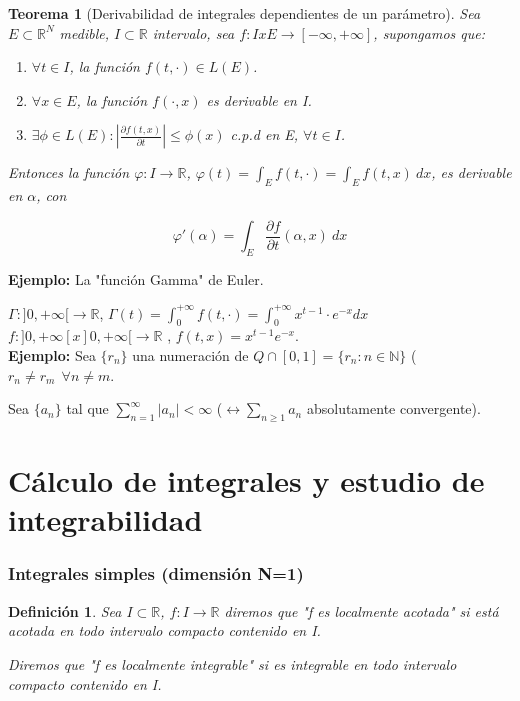 \documentclass{article}
\newtheorem{theorem}{Teorema}
\newtheorem{definition}{Definición}
\begin{document}
\begin{theorem}[Derivabilidad de integrales dependientes de un parámetro]
Sea $E \subset \mathbb{R}^N$ medible, $I \subset \mathbb{R}$ intervalo, sea $f:IxE \rightarrow [-\infty, +\infty]$, supongamos que:

\begin{enumerate}[label=(\roman*)]
\item $\forall t \in I$, la función $f(t,\cdot) \in L(E)$.
\item $\forall x \in E$, la función $f(\cdot,x)$ es derivable en I.
\item $\exists \phi \in L(E): |\frac{\partial f(t,x)}{\partial t}|\leq \phi(x)$ c.p.d en E, $\forall t \in I$.

\end{enumerate}

Entonces la función $\varphi: I \rightarrow \mathbb{R}$, $\varphi(t) = \int_E f(t,\cdot) = \int_E f(t,x) \> dx$, es derivable en $\alpha$, con 

\begin{equation}
\varphi'(\alpha) = \int_E \frac{\partial f}{\partial t}(\alpha,x) \> dx
\end{equation}

\end{theorem}

\textbf{Ejemplo:} La "función Gamma" de Euler.

$\Gamma: ]0,+\infty[ \rightarrow \mathbb{R}$, $\Gamma(t) = \int_0^{+\infty} f(t,\cdot) = \int_0^{+\infty} x^{t-1}\cdot e^{-x}dx$ \\

$f:]0,+\infty[x]0,+\infty[ \longrightarrow \mathbb{R}$ , $f(t,x) = x^{t-1}e^{-x}$. \\


\textbf{Ejemplo:} Sea $\{r_n\}$ una numeración de $Q \cap [0,1] = \{r_n: n \in \mathbb{N}\}$ ($r_n \neq r_m \>\> \forall n \neq m$.

Sea $\{a_n\}$ tal que $\sum_{n=1}^\infty |a_n| < \infty$ ($\leftrightarrow \sum_{n\geq 1} a_n$ absolutamente convergente).

\section{Cálculo de integrales y estudio de integrabilidad}
\subsubsection{Integrales simples (dimensión N=1)}
\begin{definition}
Sea $I \subset \mathbb{R}$, $f: I \rightarrow \mathbb{R}$ diremos que "f es localmente acotada" si está acotada en todo intervalo compacto contenido en I.

Diremos que "f es localmente integrable" si es integrable en todo intervalo compacto contenido en I.
\end{definition}
\end{document}
